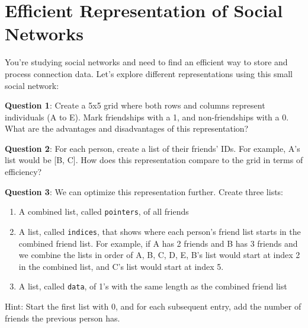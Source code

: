 \documentclass[a4paper, 14pt]{extarticle}
\begin{document}
\section*{Efficient Representation of Social Networks}

You're studying social networks and need to find an efficient way to store and process connection data. Let's explore different representations using this small social network:

\begin{center}
\end{center}

{\bf Question 1}:
Create a 5x5 grid where both rows and columns represent individuals (A to E). Mark friendships with a 1, and non-friendships with a 0. What are the advantages and disadvantages of this representation?

\vspace{10em}

{\bf Question 2}:
For each person, create a list of their friends' IDs. For example, A's list would be [B, C]. How does this representation compare to the grid in terms of efficiency?

\vspace{8em}

{\bf Question 3}:
We can optimize this representation further. Create three lists:
\begin{enumerate}
    \item A combined list, called \texttt{pointers}, of all friends
    \item A list, called \texttt{indices}, that shows where each person's friend list starts in the combined friend list. For example, if A has 2 friends and B has 3 friends and we combine the lists in order of A, B, C, D, E, B's list would start at index 2 in the combined list, and C's list would start at index 5.
    \item A list, called \texttt{data}, of 1's with the same length as the combined friend list
\end{enumerate}
Hint: Start the first list with 0, and for each subsequent entry, add the number of friends the previous person has.
\end{document}
